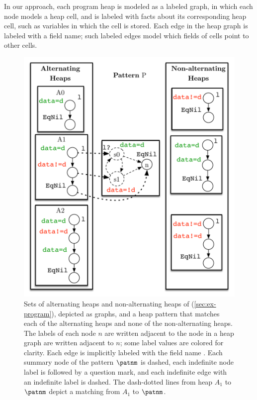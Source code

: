 In our approach, each program heap is modeled as a labeled graph, in
which each node models a heap cell, and is labeled with facts about
its corresponding heap cell, such as variables in which the cell is
stored.
%
Each edge in the heap graph is labeled with a field name;
%
such labeled edges model which fields of cells point to other cells.
\begin{figure}
  \centering
  \includegraphics[width=\linewidth]{fig/exs.pdf}
  \caption{Sets of alternating heaps and non-alternating heaps of
    \altlist (\autoref{sec:ex-program}), depicted as graphs, and a
    heap pattern that matches each of the alternating heaps and none
    of the non-alternating heaps.
    The labels of each node $n$ are written adjacent to the node in a heap
    graph are written adjacent to $n$;
    some label values are colored for clarity.
    Each edge is implicitly labeled with the field name \nextnm.
    Each summary node of the pattern $\patnm$ is dashed, each
    indefinite node label is followed by a question mark, and each
    indefinite edge with an indefinite label is dashed.
    The dash-dotted lines from heap $A_1$ to $\patnm$ depict a matching
    from $A_1$ to $\patnm$.
  }
  \label{fig:alt-pattern}
\end{figure}

